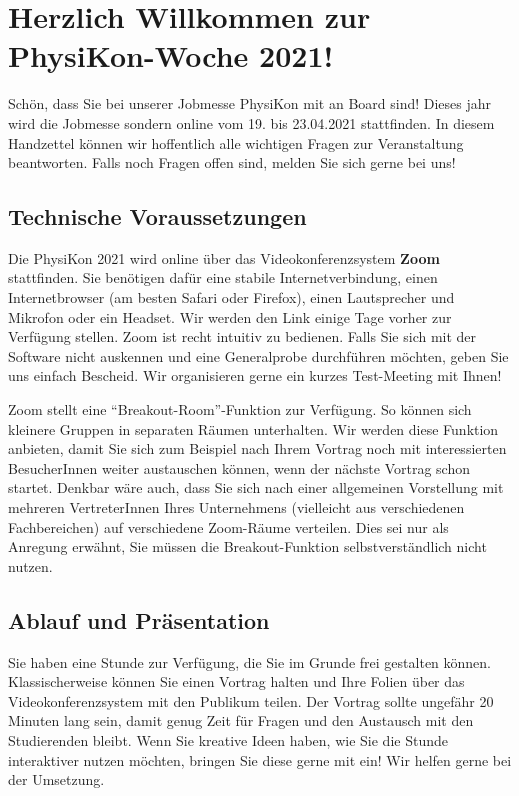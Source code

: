 \documentclass[
  paper=a4,
  fontsize=12pt,
  DIV=16,
  headheight=30pt,
  footheight=45pt,
  headinclude,
  parskip=half,
]{scrartcl}
\begin{document}
\section*{Herzlich Willkommen zur PhysiKon-Woche 2021!}

Schön, dass Sie bei unserer Jobmesse PhysiKon mit an Board sind!
Dieses jahr wird die Jobmesse sondern online vom 19. bis 23.04.2021 stattfinden.
In diesem Handzettel können wir hoffentlich alle wichtigen Fragen zur Veranstaltung beantworten.
Falls noch Fragen offen sind, melden Sie sich gerne bei uns!

\subsection*{Technische Voraussetzungen}

Die PhysiKon 2021 wird online über das Videokonferenzsystem \textbf{Zoom} stattfinden.
Sie benötigen dafür eine stabile Internetverbindung, einen Internetbrowser (am besten Safari oder Firefox), einen Lautsprecher und Mikrofon oder ein Headset.
Wir werden den Link einige Tage vorher zur Verfügung stellen.
Zoom ist recht intuitiv zu bedienen.
Falls Sie sich mit der Software nicht auskennen und eine Generalprobe durchführen möchten, geben Sie uns einfach Bescheid.
Wir organisieren gerne ein kurzes Test-Meeting mit Ihnen!

Zoom stellt eine \enquote{Breakout-Room}-Funktion zur Verfügung.
So können sich kleinere Gruppen in separaten Räumen unterhalten.
Wir werden diese Funktion anbieten, damit Sie sich zum Beispiel nach Ihrem Vortrag noch mit interessierten BesucherInnen weiter austauschen können, wenn der nächste Vortrag schon startet.
Denkbar wäre auch, dass Sie sich nach einer allgemeinen Vorstellung mit mehreren VertreterInnen Ihres Unternehmens (vielleicht aus verschiedenen Fachbereichen) auf verschiedene Zoom-Räume verteilen.
Dies sei nur als Anregung erwähnt, Sie müssen die Breakout-Funktion selbstverständlich nicht nutzen.

\subsection*{Ablauf und Präsentation}
Sie haben eine Stunde zur Verfügung, die Sie im Grunde frei gestalten können.
Klassischerweise können Sie einen Vortrag halten und Ihre Folien über das Videokonferenzsystem mit den Publikum teilen.
Der Vortrag sollte ungefähr 20 Minuten lang sein, damit genug Zeit für Fragen und den Austausch mit den Studierenden bleibt.
Wenn Sie kreative Ideen haben, wie Sie die Stunde interaktiver nutzen möchten, bringen Sie diese gerne mit ein!
Wir helfen gerne bei der Umsetzung.
\end{document}
